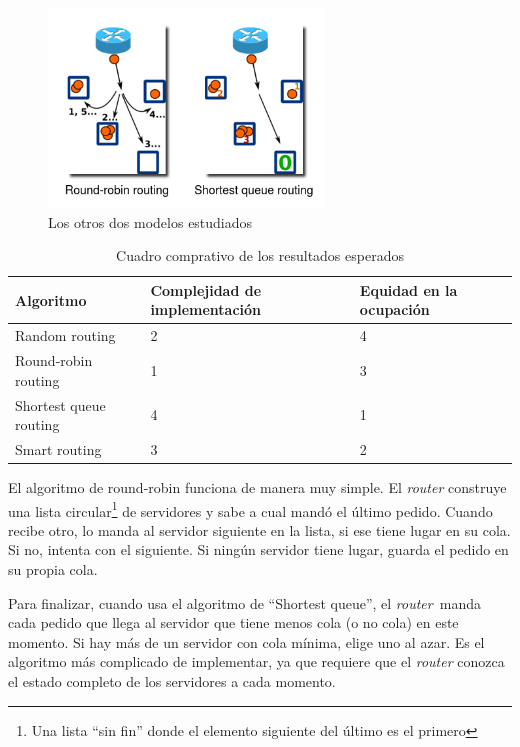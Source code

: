 \begin{figure}[h]
    \centering
    \includegraphics[height=200px]{round-robin--shortest-queue.png}
    \caption{Los otros dos modelos estudiados}
    \label{fig:round_robin+shortest_queue}
\end{figure}


\begin{table}
    \centering
    \begin{tabular}{|l||l|l|}
	\hline
	Algoritmo & Complejidad de implementación & Equidad en la ocupación \\
	\hline
	Random routing & 2 & 4 \\
	\hline
	Round-robin routing & 1 & 3 \\
	\hline
	Shortest queue routing & 4 & 1 \\
	\hline
	Smart routing & 3 & 2 \\
	\hline
    \end{tabular}
    \caption{Cuadro comprativo de los resultados esperados}
    \label{tab:compartativo-esperados}
\end{table}

El algoritmo de round-robin funciona de manera muy simple. El \textit{router} construye una lista circular\footnote{Una 
lista ``sin fin'' donde el elemento siguiente del último es el primero} de servidores y sabe a cual mandó el último pedido. 
Cuando recibe otro, lo manda al servidor siguiente en la lista, si ese tiene lugar en su cola. Si no, intenta con el
siguiente. Si ningún servidor tiene lugar, guarda el pedido en su propia cola.

Para finalizar, cuando usa el algoritmo de ``Shortest queue'', el \textit{router} manda cada pedido que llega al
servidor que tiene menos cola (o no cola) en este momento. Si hay más de un servidor con cola mínima, elige uno al
azar. Es el algoritmo más complicado de implementar, ya que requiere que el \textit{router} conozca el estado completo
de los servidores a cada momento.



